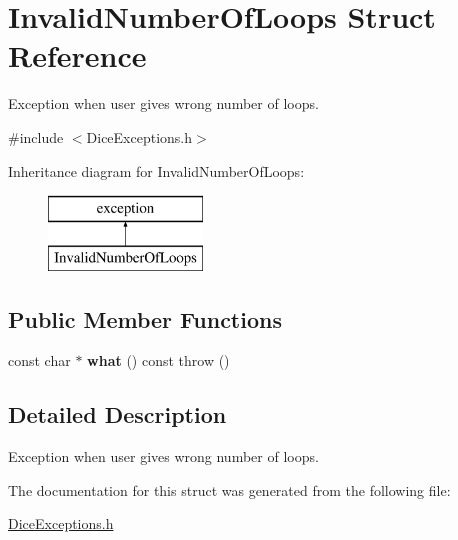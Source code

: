 \hypertarget{struct_invalid_number_of_loops}{}\section{Invalid\+Number\+Of\+Loops Struct Reference}
\label{struct_invalid_number_of_loops}


Exception when user gives wrong number of loops.  




{\ttfamily \#include $<$Dice\+Exceptions.\+h$>$}

Inheritance diagram for Invalid\+Number\+Of\+Loops\+:\begin{figure}[H]
\begin{center}
\leavevmode
\includegraphics[height=2.000000cm]{struct_invalid_number_of_loops}
\end{center}
\end{figure}
\subsection*{Public Member Functions}
\begin{DoxyCompactItemize}
\item 
\hypertarget{struct_invalid_number_of_loops_a78e4b7884b58ca7b509a33d129843578}{}\label{struct_invalid_number_of_loops_a78e4b7884b58ca7b509a33d129843578} 
const char $\ast$ {\bfseries what} () const  throw ()
\end{DoxyCompactItemize}


\subsection{Detailed Description}
Exception when user gives wrong number of loops. 

The documentation for this struct was generated from the following file\+:\begin{DoxyCompactItemize}
\item 
\hyperlink{_dice_exceptions_8h}{Dice\+Exceptions.\+h}\end{DoxyCompactItemize}
